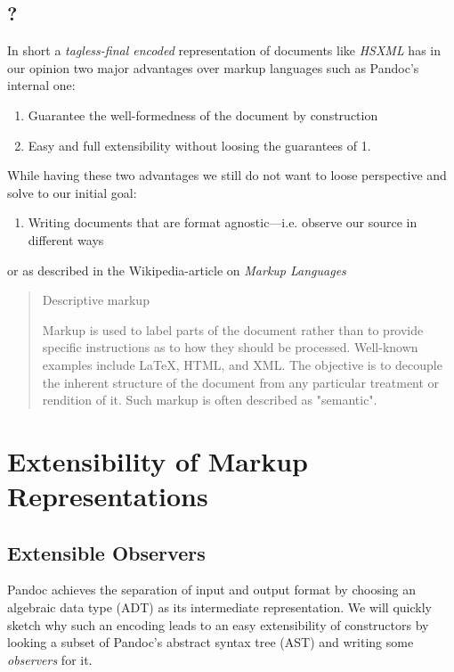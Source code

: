 \subsection{?}

In short a \emph{tagless-final encoded} representation of documents like
\emph{HSXML} has in our opinion two major advantages over markup languages such
as Pandoc’s internal one:

\begin{enumerate}
\item Guarantee the well-formedness of the document by construction
\item Easy and full extensibility without loosing the guarantees of 1.
\end{enumerate}

While having these two advantages we still do not want to loose perspective and
solve to our initial goal:

\begin{enumerate}
\item Writing documents that are format agnostic—i.e. observe our source in
different ways
\end{enumerate}

or as described in the Wikipedia-article on \emph{Markup Languages}

\begin{quote}
Descriptive markup

Markup is used to label parts of the document rather than to provide specific
instructions as to how they should be processed. Well-known examples include
\LaTeX{}, HTML, and XML. The objective is to decouple the inherent structure of
the document from any particular treatment or rendition of it. Such markup is
often described as "semantic".
\end{quote}

\section{Extensibility of Markup Representations}
\subsection{Extensible Observers}

Pandoc achieves the separation of input and output format by choosing an
algebraic data type (ADT) as its intermediate representation. We will quickly
sketch why such an encoding leads to an easy extensibility of constructors by
looking a subset of Pandoc's abstract syntax tree (AST) and writing some
\emph{observers} for it.


